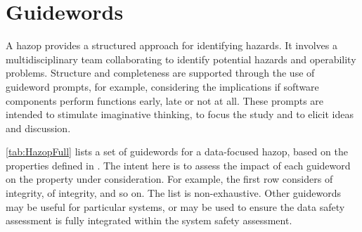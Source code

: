 %
%
\chapter{ Guidewords} \label{bkm:guidewords}


A \gls{hazop} \cite{citation:iec61882:2016}
provides a structured approach for identifying hazards. It involves a multidisciplinary team collaborating to identify potential hazards and operability problems. Structure and \gls{completeness} are supported through the use of guideword prompts, for example, considering the implications if software components perform functions early, late or not at all. These prompts are intended to stimulate imaginative thinking, to focus the study and to elicit ideas and discussion.

\autoref{tab:HazopFull} lists a set of guidewords for a data-focused \gls{hazop}, based on the properties defined in . The intent here is to assess the impact of each guideword on the property under consideration. For example, the first row considers  of \gls{integrity},  of \gls{integrity}, and so on.
The list is non-exhaustive. Other guidewords may be useful for particular systems, or may be used to ensure the data safety assessment is fully integrated within the system safety assessment.

